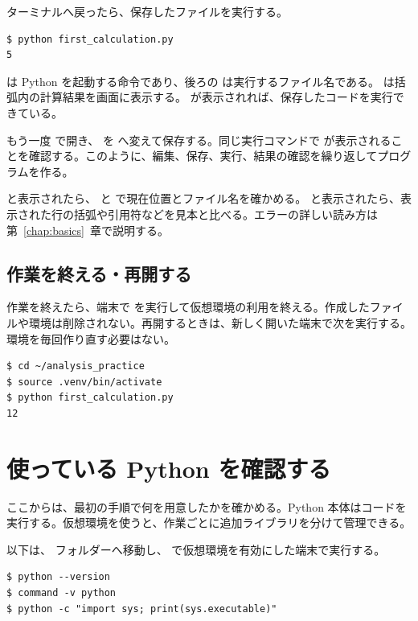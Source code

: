 ターミナルへ戻ったら、保存したファイルを実行する。

\begin{lstlisting}[numbers=none, xleftmargin=2\zw]
$ python first_calculation.py
5
\end{lstlisting}

 は Python を起動する命令であり、後ろの  は実行するファイル名である。 は括弧内の計算結果を画面に表示する。 が表示されれば、保存したコードを実行できている。

もう一度  で開き、 を  へ変えて保存する。同じ実行コマンドで  が表示されることを確認する。このように、編集、保存、実行、結果の確認を繰り返してプログラムを作る。

 と表示されたら、 と  で現在位置とファイル名を確かめる。 と表示されたら、表示された行の括弧や引用符などを見本と比べる。エラーの詳しい読み方は第~\ref{chap:basics}~章で説明する。

\subsection{作業を終える・再開する}

作業を終えたら、端末で  を実行して仮想環境の利用を終える。作成したファイルや環境は削除されない。再開するときは、新しく開いた端末で次を実行する。環境を毎回作り直す必要はない。

\begin{lstlisting}[numbers=none, xleftmargin=2\zw]
$ cd ~/analysis_practice
$ source .venv/bin/activate
$ python first_calculation.py
12
\end{lstlisting}

\section{使っている Python を確認する}

ここからは、最初の手順で何を用意したかを確かめる。Python 本体はコードを実行する。仮想環境を使うと、作業ごとに追加ライブラリを分けて管理できる。

以下は、 フォルダーへ移動し、 で仮想環境を有効にした端末で実行する。

\begin{lstlisting}[numbers=none, xleftmargin=2\zw]
$ python --version
$ command -v python
$ python -c "import sys; print(sys.executable)"
\end{lstlisting}

